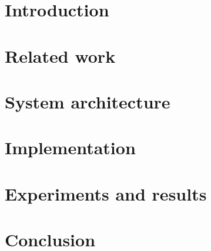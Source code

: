 
\chapter{Introduction}


\chapter{Related work}


\chapter{System architecture}


\chapter{Implementation}


\chapter{Experiments and results}


\chapter{Conclusion}


